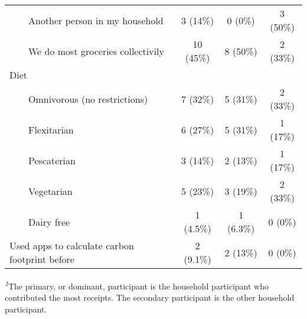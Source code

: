 \begin{longtable}{lccc}
    Another person in my household & 3 (14\%) & 0 (0\%) & 3 (50\%) \\ 
    We do most groceries collectivily & 10 (45\%) & 8 (50\%) & 2 (33\%) \\ 
Diet &  &  &  \\ 
    Omnivorous (no restrictions) & 7 (32\%) & 5 (31\%) & 2 (33\%) \\ 
    Flexitarian & 6 (27\%) & 5 (31\%) & 1 (17\%) \\ 
    Pescaterian & 3 (14\%) & 2 (13\%) & 1 (17\%) \\ 
    Vegetarian & 5 (23\%) & 3 (19\%) & 2 (33\%) \\ 
    Dairy free & 1 (4.5\%) & 1 (6.3\%) & 0 (0\%) \\ 
Used apps to calculate carbon footprint before & 2 (9.1\%) & 2 (13\%) & 0 (0\%) \\ 
\bottomrule
\end{longtable}
\begin{minipage}{\linewidth}
\textsuperscript{\textit{1}}The primary, or dominant, participant is the household participant who contributed the most receipts. The secondary participant is the other household participant.\\
\end{minipage}

